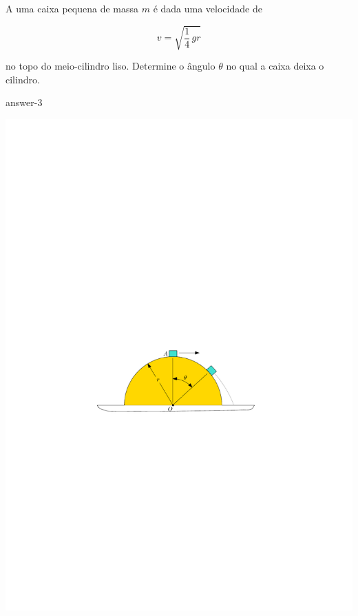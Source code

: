 
\item A uma caixa pequena de massa $m$ é dada uma velocidade de 

\begin{equation}
    v=\sqrt{\dfrac{1}{4}\,gr} 
\end{equation}

no topo do meio-cilindro liso. Determine o ângulo $\theta$ no qual a caixa deixa o cilindro.

{answer-3}

\begin{flushright}
    \includegraphics[scale=1.2]{images/draw_3.pdf}
\end{flushright}